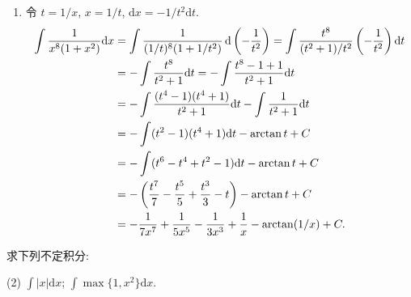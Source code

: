 \begin{solution}
\begin{enumerate}
        \item %
              令 $t = 1/x$, $x = 1/t$, $\mathrm{d}x = -1/t^2 \mathrm{d}t$.
              \begin{align*}
                  \int \frac{1}{x^8 (1 + x^2)} \mathrm{d}x & = \int \frac{1}{(1/t)^8 (1 + 1/t^2)} \operatorname{d}\left(-\frac{1}{t^2}\right) = \int \frac{t^8}{(t^2+1)/t^2} \left(-\frac{1}{t^2}\right) \mathrm{d}t \\
                                                           & = -\int \frac{t^8}{t^2 + 1} \mathrm{d}t = -\int \frac{t^8 - 1 + 1}{t^2 + 1} \mathrm{d}t                                                      \\
                                                           & = -\int \frac{(t^4 - 1)(t^4 + 1)}{t^2 + 1} \mathrm{d}t - \int \frac{1}{t^2 + 1} \mathrm{d}t                                                  \\
                                                           & = -\int (t^2 - 1)(t^4 + 1) \mathrm{d}t - \arctan t + C                                                                                       \\
                                                           & = -\int (t^6 - t^4 + t^2 - 1) \mathrm{d}t - \arctan t + C                                                                                    \\
                                                           & = -\left( \frac{t^7}{7} - \frac{t^5}{5} + \frac{t^3}{3} - t \right) - \arctan t + C                                                          \\
                                                           & = -\frac{1}{7x^7} + \frac{1}{5x^5} - \frac{1}{3x^3} + \frac{1}{x} - \arctan(1/x) + C.
              \end{align*}
    \end{enumerate}
\end{solution}

\begin{exercise}[4.1.4]
    求下列不定积分:
    \begin{tasks}(2)
        \task $\displaystyle \int |x| \mathrm{d}x$;
        \task $\displaystyle \int \max\{1, x^2\} \mathrm{d}x$.
    \end{tasks}
\end{exercise}

